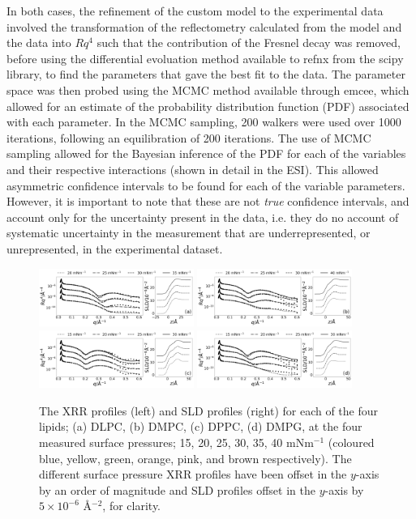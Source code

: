 \documentclass[twoside,twocolumn,9pt]{article}
\begin{document}
In both cases, the refinement of the custom model to the experimental data involved the transformation of the reflectometry calculated from the model and the data into $Rq^4$ such that the contribution of the Fresnel decay was removed, before using the differential evoluation method available to refnx from the scipy library,\cite{Jones2001} to find the parameters that gave the best fit to the data. The parameter space was then probed using the MCMC method available through emcee,\cite{Foreman-Mackey2013} which allowed for an estimate of the probability distribution function (PDF) associated with each parameter. In the MCMC sampling, 200 walkers were used over 1000 iterations, following an equilibration of 200 iterations. The use of MCMC sampling allowed for the Bayesian inference of the PDF for each of the variables and their respective interactions (shown in detail in the ESI). This allowed asymmetric confidence intervals to be found for each of the variable parameters. However, it is important to note that these are not \emph{true} confidence intervals, and account only for the uncertainty present in the data, i.e. they do no account of systematic uncertainty in the measurement that are underrepresented, or unrepresented, in the experimental dataset.

%
\begin{figure}
	\centering
	\includegraphics[width=0.45\textwidth]{figures/dlpc_ref_sld}
	\includegraphics[width=0.45\textwidth]{figures/dmpc_ref_sld}
	\includegraphics[width=0.45\textwidth]{figures/dppc_ref_sld}
	\includegraphics[width=0.45\textwidth]{figures/dmpg_ref_sld}
	\caption{The XRR profiles (left) and SLD profiles (right) for each of the four lipids; (a) DLPC, (b) DMPC, (c) DPPC, (d) DMPG, at the four measured surface pressures; 15, 20, 25, 30, 35, 40 mNm$^{-1}$ (coloured blue, yellow, green, orange, pink, and brown respectively). The different surface pressure XRR profiles have been offset in the $y$-axis by an order of magnitude and SLD profiles offset in the $y$-axis by $5\times10^{-6}$ \AA$^{-2}$, for clarity.}
	\label{fig:lipids}
\end{figure}
%
\end{document}
